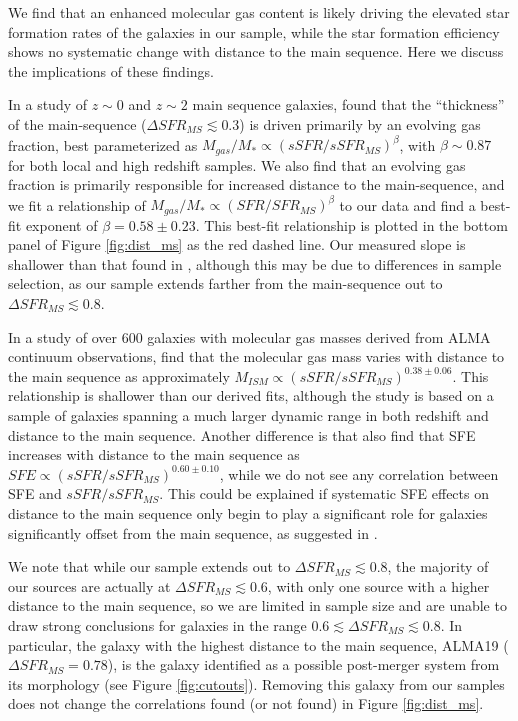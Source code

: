 \documentclass[a4paper,fleqn,usenatbib]{mnras}
\begin{document}
We find that an enhanced molecular gas content is likely driving the elevated star formation rates of the galaxies in our sample, while the star formation efficiency shows no systematic change with distance to the main sequence. Here we discuss the implications of these findings. 

In a study of $z \sim 0$ and $z \sim 2$ main sequence galaxies, \citet{2012ApJ...760....6M} found that the ``thickness'' of the main-sequence ($\Delta SFR_{MS} \lesssim 0.3$) is driven primarily by an evolving gas fraction, best parameterized as $M_{gas} / M_{*} \propto (sSFR/sSFR_{MS})^{\beta}$, with $\beta \sim 0.87$ for both local and high redshift samples.  We also find that an evolving gas fraction is primarily responsible for increased distance to the main-sequence, and we fit a relationship of $M_{gas} / M_{*} \propto (SFR/SFR_{MS})^{\beta}$ to our data and find a best-fit exponent of $\beta = 0.58 \pm 0.23$. This best-fit relationship is plotted in the bottom panel of Figure \ref{fig:dist_ms} as the red dashed line. Our measured slope is shallower than that found in \citet{2012ApJ...760....6M}, although this may be due to differences in sample selection, as our sample extends farther from the main-sequence out to $\Delta SFR_{MS} \lesssim 0.8$.  

In a study of over 600 galaxies with molecular gas masses derived from ALMA continuum observations, \citet{2017ApJ...837..150S} find that the molecular gas mass varies with distance to the main sequence as approximately $M_{ISM} \propto (sSFR/sSFR_{MS})^{0.38 \pm 0.06}$. This relationship is shallower than our derived fits, although the \citet{2017ApJ...837..150S} study is based on a sample of galaxies spanning a much larger dynamic range in both redshift and distance to the main sequence. Another difference is that \citet{2017ApJ...837..150S} also find that SFE increases with distance to the main sequence as $SFE \propto (sSFR/sSFR_{MS})^{0.60 \pm 0.10}$, while we do not see any correlation between SFE and $sSFR/sSFR_{MS}$. This could be explained if systematic SFE effects on distance to the main sequence only begin to play a significant role for galaxies significantly offset from the main sequence, as suggested in \citet{2012ApJ...760....6M,2014ApJ...793...19S}.

We note that while our sample extends out to $\Delta SFR_{MS} \lesssim 0.8$, the majority of our sources are actually at $\Delta SFR_{MS} \lesssim 0.6$, with only one source with a higher distance to the main sequence, so we are limited in sample size and are unable to draw strong conclusions for galaxies in the range $0.6 \lesssim \Delta SFR_{MS} \lesssim 0.8$.  In particular, the galaxy with the highest distance to the main sequence, ALMA19 ($\Delta SFR_{MS} = 0.78$), is the galaxy identified as a possible post-merger system from its morphology (see Figure \ref{fig:cutouts}). Removing this galaxy from our samples does not change the correlations found (or not found) in Figure \ref{fig:dist_ms}.
\end{document}
